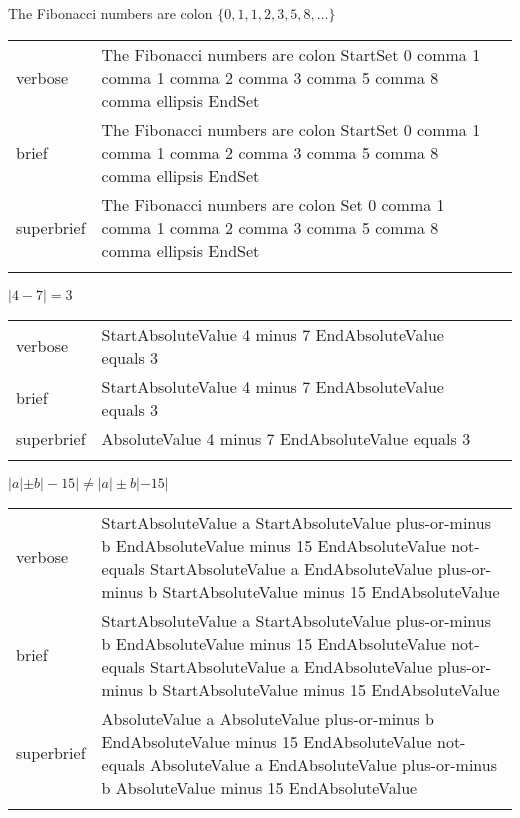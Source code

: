 
\label{sec:grouping}

\R
\E The Fibonacci numbers are colon $\{0,1,1,2,3,5,8,\ldots\}$
\begin{longtable}[c]{@{}lll@{}}
\toprule\addlinespace
verbose & The Fibonacci numbers are colon StartSet 0 comma 1 comma 1
comma 2 comma 3 comma 5 comma 8 comma ellipsis EndSet &

\\\addlinespace
brief & The Fibonacci numbers are colon StartSet 0 comma 1 comma 1 comma
2 comma 3 comma 5 comma 8 comma ellipsis EndSet &

\\\addlinespace
superbrief & The Fibonacci numbers are colon Set 0 comma 1 comma 1 comma
2 comma 3 comma 5 comma 8 comma ellipsis EndSet &

\\\addlinespace
\bottomrule
\end{longtable}



\R
\E $|4-7|=3$
\begin{longtable}[c]{@{}lll@{}}
\toprule\addlinespace
verbose & StartAbsoluteValue 4 minus 7 EndAbsoluteValue equals 3 &

\\\addlinespace
brief & StartAbsoluteValue 4 minus 7 EndAbsoluteValue equals 3 &

\\\addlinespace
superbrief & AbsoluteValue 4 minus 7 EndAbsoluteValue equals 3 &

\\\addlinespace
\bottomrule
\end{longtable}


\E $\left|a\left|\pm b\right|-15\right|\neq \left|a\right|\pm b\left|-15\right|$
\begin{longtable}[c]{@{}ll@{}}
\toprule\addlinespace
verbose & StartAbsoluteValue a StartAbsoluteValue plus-or-minus b
EndAbsoluteValue minus 15 EndAbsoluteValue not-equals StartAbsoluteValue
a EndAbsoluteValue plus-or-minus b StartAbsoluteValue minus 15
EndAbsoluteValue
\\\addlinespace
brief & StartAbsoluteValue a StartAbsoluteValue plus-or-minus b
EndAbsoluteValue minus 15 EndAbsoluteValue not-equals StartAbsoluteValue
a EndAbsoluteValue plus-or-minus b StartAbsoluteValue minus 15
EndAbsoluteValue
\\\addlinespace
superbrief & AbsoluteValue a AbsoluteValue plus-or-minus b
EndAbsoluteValue minus 15 EndAbsoluteValue not-equals AbsoluteValue a
EndAbsoluteValue plus-or-minus b AbsoluteValue minus 15 EndAbsoluteValue
\\\addlinespace
\bottomrule
\end{longtable}



